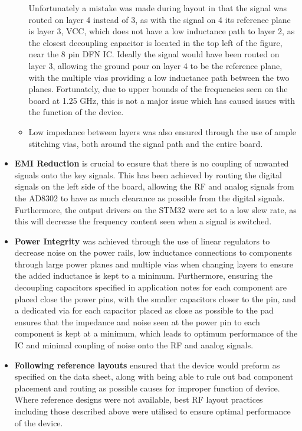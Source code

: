 \begin{itemize}
\begin{itemize}
		Unfortunately a mistake was made during layout in that the signal was routed on layer 4 instead of 3, as with the signal on 4 its reference plane is layer 3, VCC, which does not have a low inductance path to layer 2, as the closest decoupling capacitor is located in the top left of the figure, near the 8 pin DFN IC. Ideally the signal would have been routed on layer 3,  allowing the ground pour on layer 4 to be the reference plane, with the multiple vias providing a low inductance path between the two planes. Fortunately, due to upper bounds of the frequencies seen on the board at 1.25 GHz, this is not a major issue which has caused issues with the function of the device. 
		\item Low impedance between layers was also ensured through the use of ample stitching vias, both around the signal path and the entire board. 
	\end{itemize}
	\item \textbf{EMI Reduction} is crucial to ensure that there is no coupling of unwanted signals onto the key signals. This has been achieved by routing the digital signals on the left side of the board, allowing the RF and analog signals from the AD8302 to have as much clearance as possible from the digital signals. Furthermore, the output drivers on the STM32 were set to a low slew rate, as this will decrease the frequency content seen when a signal is switched. 
	\item \textbf{Power Integrity} was achieved through the use of linear regulators to decrease noise on the power rails, low inductance connections to components through large power planes and multiple vias when changing layers to ensure the added inductance is kept to a minimum. Furthermore, ensuring the decoupling capacitors specified in application notes for each component are placed close the power pins, with the smaller capacitors closer to the pin, and a dedicated via for each capacitor placed as close as possible to the pad ensures that the impedance and noise seen at the power pin to each component is kept at a minimum, which leads to optimum performance of the IC and minimal coupling of noise onto the RF and analog signals.
	\item \textbf{Following reference layouts} ensured that the device would preform as specified on the data sheet, along with being able to rule out bad component placement and routing as possible causes for improper function of device. Where reference designs were not available, best RF layout practices including those described above were utilised to ensure optimal performance of the device.  
\end{itemize} 

